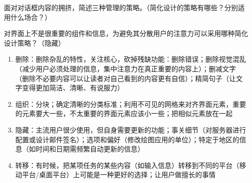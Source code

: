 \begin{solution}
\vspace{-0.5em}
\begin{table}[H]
\centering
{}
\end{table}
\vspace{-1em}
\end{solution}



\begin{problem}[2014、2016、2023]
面对对话框内容的拥挤，简述三种管理的策略。（简化设计的策略有哪些？分别适用什么场合？）

对界面上不是很重要的组件和信息，为避免其分散用户的注意力可以采用哪种简化设计策略？（{\kaishu 隐藏}）
\end{problem}

\begin{solution}
\begin{enumerate}[label=\arabic*.]
    \item 删除：删除杂乱的特性，关注核心，砍掉残缺功能：删除错误；删除视觉混乱（减少用户必须处理的信息，集中注意力在真正重要的内容上）；删减文字（删除不必要内容可以让读者对自己看到的内容更有自信）；精简句子（让文字变得更加简洁、清晰、有说服力）
    \item 组织：分块；确定清晰的分类标准；利用不可见的网格来对齐界面元素，重要的元素要大一些，不太重要的界面元素应该小一些；把相似元素放在一起
    \item 隐藏：主流用户很少使用，但自身需要更新的功能；事关细节（对服务器进行配置或设计邮件签名）；选项和偏好（修改绘图应用的单位）；特定于地区的信息（如时间和日期需频繁自动更新的信息）
    \item 转移：有时候，把某项任务的某些内容（如输入信息）转移到不同的平台（移动平台/桌面平台）上可能是一种更好的选择；让用户做擅长的事情
\end{enumerate}
\end{solution}



